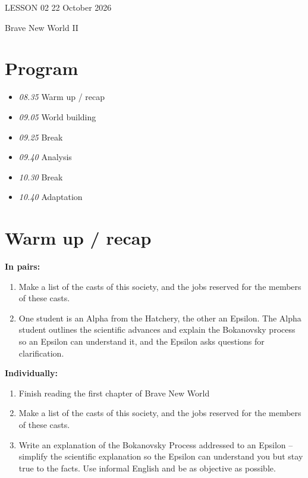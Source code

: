 \documentclass[11pt,a4paper,oneside]{book}
\newcommand{\tasktitle}[1]{{\color{blue}\bfseries #1}\par\smallskip}
\begin{document}
\clearpage{}
{\color{blue}\small LESSON 02 \hfill 22 October 2026\par}
\vspace{4mm}
{\displayfont\color{navy}\fontsize{30}{34}\selectfont Brave New World II\par}\vspace{4mm}

\section*{Program}

\begin{itemize}
\item \emph{08.35} Warm up / recap
\item \emph{09.05} World building
\item \emph{09.25} Break
\item \emph{09.40} Analysis
\item \emph{10.30} Break
\item \emph{10.40} Adaptation
\end{itemize}

\section*{Warm up / recap}
\begin{taskbox}
\tasktitle{In pairs:}
\begin{enumerate}
\item Make a list of the casts of this society, and the jobs reserved for the members of these casts.
\item One student is an Alpha from the Hatchery, the other an Epsilon. The Alpha student outlines the scientific advances and explain the Bokanovsky process so an Epsilon can understand it, and the Epsilon asks questions for clarification.
\end{enumerate}
\end{taskbox}
\begin{taskbox}
\tasktitle{Individually:}
\begin{enumerate}
\item Finish reading the first chapter of Brave New World
\item Make a list of the casts of this society, and the jobs reserved for the members of these casts.
\item Write an explanation of the Bokanovsky Process addressed to an Epsilon – simplify the scientific explanation so the Epsilon can understand you but stay true to the facts. Use informal English and be as objective as possible.
\end{enumerate}
\end{taskbox}
\end{document}
